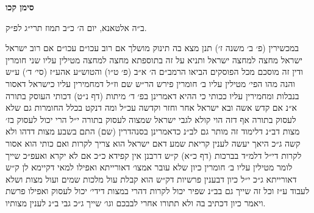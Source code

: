 \documentclass[12pt, openany]{book}
\newcommand{\chapname}{}
\newcommand{\newchap}[1]{
	\addcontentsline{toc}{chapter}{#1}
	\renewcommand{\chapname}{#1}
		\begin{center}
			\textbf{%
\fontsize{16pt}{16pt}\selectfont
				#1}
		\end{center}
}
\begin{document}
\newchap{סימן קכו}
\begin{multicols}{2}
ב״ה אלטאנא, יום ה׳ כ״ב תמוז תרי״ג לפ״ק.\\\vspace{0pt}

במכשירין (פ׳ ב׳ משנה ז׳) תנן מצא בה תינוק מושלך אם רוב עכו״ם עכו״ם אם רוב ישראל ישראל מחצה למחצה ישראל ותניא על זה בתוספתא מחצה למחצה מטילין עליו שני חומרין ודין זה מוסכם מכל הפוסקים הביאו הרמב״ם ה׳ א״ב (פ׳ ט״ו) והטוש״ע אהע״ז (סי׳ ד׳) ע״ש והנה מהו הפי׳ מטילין עליו ב׳ חומרין פירש הר״ש שם וז״ל דמחמירין עליו כישראל דאסור בנבלות ומחמירין עליו ככותי כי ההיא דאמרינן בפ׳ ד׳ מיתות (דף נ״ט) דכותי העוסק בתורה א״נ אם קדש אשה ובא ישראל אחר וחזר וקדשה עכ״ל ומה דנקט בכלל החומרות גם שלא לעסוק בתורה אף דזה הוי קולא לגבי ישראל שמצוה לעסוק בתורה י״ל הרי יכול לעסוק בז׳ מצות דב״נ דלימוד זה מותר גם לב״נ כדאמרינן בסנהדרין (שם) התם בשבע מצות דדהו ולא קשה ג״כ היאך יעשה לענין קריאת שמע דאם ישראל הוא צריך לקרות ואם כותי הוא אסור לקרות די״ל דלמ״ד בברכות (דף כ״א) ק״ש דרבנן אין קפידא כ״כ אם לא יקרא ואעפ״כ שייך לומר מטילין עליו ב׳ חומרין כיון שלא עובר אמצו׳ דאורייתא ואפילו למאי דקיימא לן ק״ש דאורייתא ג״כ י״ל כיון דבענין פרשיות דק״ש הוא קבלת עול מלכות שמים ועול מצות ושלא לעבוד ע״ז וכל זה שייך גם בב״נ שפיר יכול לקרות דהרי במצות דידי׳ יכול לעסוק ואפילו פרשת ויאמר כיון דכתיב בה ולא תתורו אחרי לבבכם וגו׳ שייך ג״כ גבי ב״נ לענין מצותיו.\\\vspace{0pt}


\end{multicols}
\end{document}
